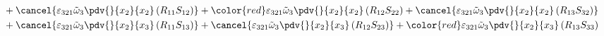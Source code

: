 \begin{equation}
\begin{split}
&		+\cancel{\varepsilon_{321}\tilde{\omega}_{3}\pdv{}{x_{2}}{x_{2}}\left(R_{11}S_{12}\right)}
		+{\color{red}\varepsilon_{321}\tilde{\omega}_{3}\pdv{}{x_{2}}{x_{2}}\left(R_{12}S_{22}\right)}
		+\cancel{\varepsilon_{321}\tilde{\omega}_{3}\pdv{}{x_{2}}{x_{2}}\left(R_{13}S_{32}\right)}\\
&		+\cancel{\varepsilon_{321}\tilde{\omega}_{3}\pdv{}{x_{2}}{x_{3}}\left(R_{11}S_{13}\right)}
		+\cancel{\varepsilon_{321}\tilde{\omega}_{3}\pdv{}{x_{2}}{x_{3}}\left(R_{12}S_{23}\right)}
		+{\color{red}\varepsilon_{321}\tilde{\omega}_{3}\pdv{}{x_{2}}{x_{3}}\left(R_{13}S_{33}\right)}\\
	\end{split}
\end{equation}
